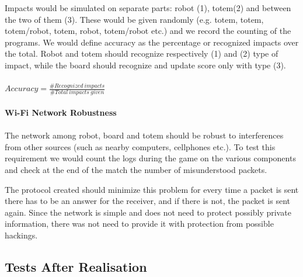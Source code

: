\documentclass[a4paper,twoside]{book}
\begin{document}
Impacts would be simulated on separate parts: robot (1), totem(2) and between the two of them (3). These would be given randomly (e.g. totem, totem, totem/robot, totem, robot, totem/robot etc.) and we record the counting of the programs. We would define accuracy as the percentage or recognized impacts over the total. Robot and totem should recognize respectively (1) and (2) type of impact, while the board should recognize and update score only with type (3).
\\
\\
$Accuracy=\frac{\#Recognized\ impacts}{\#Total\ impacts\ given}$
\\
\\
\textbf{Wi-Fi Network Robustness}
\\
\\
The network among robot, board and totem should be robust to interferences from other sources (such as nearby computers, cellphones etc.). To test this requirement we would count the logs during the game on the various components and check at the end of the match the number of misunderstood packets. 

The protocol created should minimize this problem for every time a packet is sent there has to be an answer for the receiver, and if there is not, the packet is sent again. Since the network is simple and does not need to protect possibly private information, there was not need to provide it with protection from possible hackings.

\subsection{Tests After Realisation}
\end{document}
